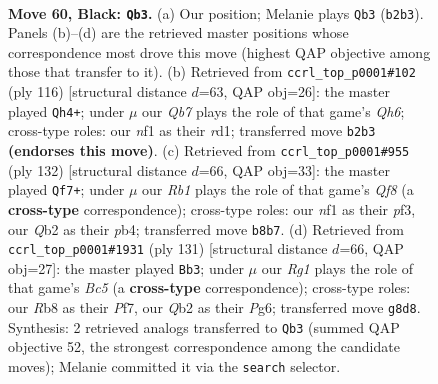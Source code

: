 \documentclass[11pt]{article}
\begin{document}
\clearpage

\begin{figure}[p]\centering
\begin{subfigure}{0.46\textwidth}\centering
\resizebox{\linewidth}{!}{%
\newchessgame
\chessboard[
  setfen={1r4r1/p5p1/4Q2p/1k1p3P/p2P2P1/4P2K/1q6/4bN2 b - - 29 60},
  showmover=false,
  pgfstyle=straightmove, color=movearrow, markmove={b2-b3}
]}
\caption{}
\end{subfigure}\hfill
\begin{subfigure}{0.46\textwidth}\centering
\resizebox{\linewidth}{!}{%
\newchessgame
\chessboard[
  setfen={8/4kp2/3p3Q/2qPp3/8/P4PP1/1P3RK1/3r4 w - - 3 59},
  showmover=false,
  pgfstyle=straightmove, color=movearrow, markmove={h6-h4}
]}
\caption{}
\end{subfigure}
\\[4pt]
\begin{subfigure}{0.46\textwidth}\centering
\resizebox{\linewidth}{!}{%
\newchessgame
\chessboard[
  setfen={5Q2/2k3p1/2b3Pp/2p4P/1pPq4/1P3p2/KR6/8 w - - 10 67},
  showmover=false,
  pgfstyle=straightmove, color=movearrow, markmove={f8-f7}
]}
\caption{}
\end{subfigure}\hfill
\begin{subfigure}{0.46\textwidth}\centering
\resizebox{\linewidth}{!}{%
\newchessgame
\chessboard[
  setfen={8/kr3p2/2Q1p1p1/p2pP3/P1b2P2/4PK2/8/8 b - - 6 66},
  showmover=false,
  pgfstyle=straightmove, color=movearrow, markmove={c4-b3}
]}
\caption{}
\end{subfigure}
\caption{\textbf{Move 60, Black: \texttt{Qb3}.} (a) Our position; Melanie plays \texttt{Qb3} (\texttt{b2b3}). Panels (b)--(d) are the retrieved master positions whose correspondence most drove this move (highest QAP objective among those that transfer to it). (b) Retrieved from \texttt{ccrl\_top\_p0001\#102} (ply 116) [structural distance $d$=63, QAP obj=26]: the master played \texttt{Qh4+}; under $\mu$ our \emph{Qb7} plays the role of that game's \emph{Qh6}; cross-type roles: our \emph{n}f1 as their \emph{r}d1; transferred move \texttt{b2b3} \textbf{(endorses this move)}. (c) Retrieved from \texttt{ccrl\_top\_p0001\#955} (ply 132) [structural distance $d$=66, QAP obj=33]: the master played \texttt{Qf7+}; under $\mu$ our \emph{Rb1} plays the role of that game's \emph{Qf8} (a \textbf{cross-type} correspondence); cross-type roles: our \emph{n}f1 as their \emph{p}f3, our \emph{Q}b2 as their \emph{p}b4; transferred move \texttt{b8b7}. (d) Retrieved from \texttt{ccrl\_top\_p0001\#1931} (ply 131) [structural distance $d$=66, QAP obj=27]: the master played \texttt{Bb3}; under $\mu$ our \emph{Rg1} plays the role of that game's \emph{Bc5} (a \textbf{cross-type} correspondence); cross-type roles: our \emph{R}b8 as their \emph{P}f7, our \emph{Q}b2 as their \emph{P}g6; transferred move \texttt{g8d8}. Synthesis: 2 retrieved analogs transferred to \texttt{Qb3} (summed QAP objective 52, the strongest correspondence among the candidate moves); Melanie committed it via the \texttt{search} selector.}
\label{fig:thought-m119}
\end{figure}
\end{document}
